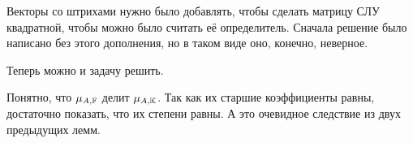 \begin{remark}
    Векторы со штрихами нужно было добавлять, чтобы сделать матрицу СЛУ квадратной, чтобы можно было считать её определитель. Сначала решение было написано без этого дополнения, но в таком виде оно, конечно, неверное.
\end{remark}

Теперь можно и задачу решить.

\begin{solution}
    Понятно, что $\mu_{A, \mathbb{F}}$ делит $\mu_{A, \mathbb{K}}$. Так как их старшие коэффициенты равны, достаточно показать, что их степени равны. А это очевидное следствие из двух предыдущих лемм.
\end{solution}


